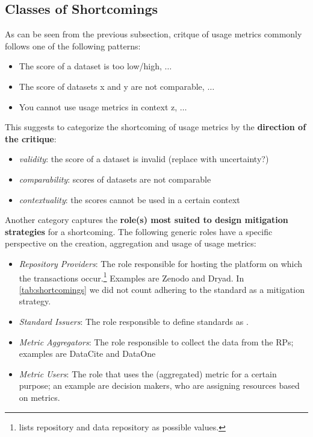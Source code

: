 \documentclass[conference, a4paper]{IEEEtran}\usepackage[]{graphicx}\usepackage[]{color}
\begin{document}
\subsection{Classes of Shortcomings}

As can be seen from the previous subsection,
critque of usage metrics commonly follows one of the following patterns:
\begin{itemize}
    \item The score of a dataset is too low/high, $\dots$
    \item The score of datasets x and y are not comparable, $\dots$
    \item You cannot use usage metrics in context z, $\dots$
\end{itemize}
This suggests to categorize the shortcoming of usage metrics by the \textbf{direction of the critique}:
\begin{itemize}
    \item \emph{validity}: the score of a dataset is invalid (replace with uncertainty?)
    \item \emph{comparability}: scores of datasets are not comparable
    \item \emph{contextuality}: the scores cannot be used in a certain context
\end{itemize}


Another category captures the \textbf{role(s) most suited to design mitigation strategies}
for a shortcoming.
The following generic roles have a specific perspective
on the creation, aggregation and usage of usage metrics:
\begin{itemize}
    \item \emph{Repository Providers}:
        The role responsible for hosting the platform on which the transactions
        occur.\footnote{\cite{cop} lists repository and data repository as possible values.}
        Examples are Zenodo and Dryad.
        In \autoref{tab:shortcomings} we did not count
        adhering to the standard as a mitigation strategy.
    \item  \emph{Standard Issuers}:
        The role responsible to define standards as \cite{cop}.
    \item  \emph{Metric Aggregators}:
        The role responsible to collect the data from the RPs;
        examples are DataCite and DataOne
    \item  \emph{Metric Users}:
        The role that uses the (aggregated) metric for a certain purpose;
        an example are decision makers, who are assigning resources based on metrics.
\end{itemize}
\end{document}
